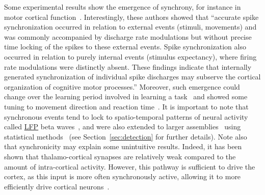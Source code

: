 \documentclass[brainsci, %
               review,submit,pdftex,moreauthors
               ]{Definitions/mdpi}
\begin{document}
Some experimental results show the emergence of synchrony, for instance in motor cortical function~\citep{riehle_spike_1997}. Interestingly, these authors showed that ``accurate spike synchronization occurred in relation to external events (stimuli, movements) and was commonly accompanied by discharge rate modulations but without precise time locking of the spikes to these external events. Spike synchronization also occurred in relation to purely internal events (stimulus expectancy), where firing rate modulations were distinctly absent. These findings indicate that internally generated synchronization of individual spike discharges may subserve the cortical organization of cognitive motor processes.'' Moreover, such emergence could change over the learning period involved in learning a task~\citep{kilavik_long-term_2009} and showed some tuning to movement direction and reaction time~\citep{grammont_spike_2003}. It is important to note that synchronous events tend to lock to spatio-temporal patterns of neural activity called \href{https://en.wikipedia.org/wiki/Local_field_potential}{LFP} beta waves~\citep{denker_lfp_2018}, and were also extended to larger assemblies~\citep{torre_synchronous_2016} using statistical methods~\citep{torre_asset_2016} (see Section~\ref{sec:detection} for further details). Note also that synchronicity may explain some unintuitive results. Indeed, it has been shown that thalamo-cortical synapses are relatively weak compared to the amount of intra-cortical activity. However, this pathway is sufficient to drive the cortex, as this input is more often synchronously active, allowing it to more efficiently drive cortical neurons~\citep{bruno_cortex_2006}. 
\end{document}
